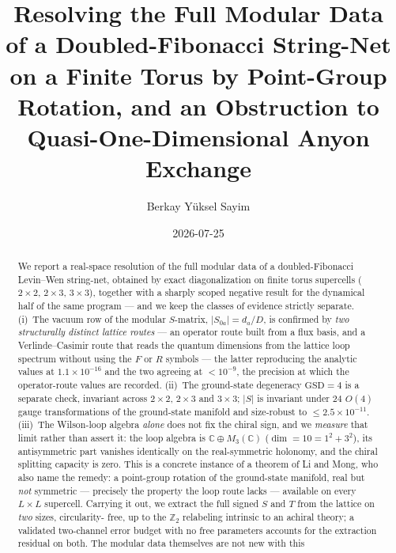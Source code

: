 \documentclass[aps,pra,twocolumn,superscriptaddress,longbibliography,floatfix,nofootinbib]{revtex4-2}
\begin{document}
\setcounter{secnumdepth}{3}

\title{Resolving the Full Modular Data of a Doubled-Fibonacci String-Net
       on a Finite Torus by Point-Group Rotation, and an Obstruction to
       Quasi-One-Dimensional Anyon Exchange}

\author{Berkay Y\"uksel Sayim}

\date{2026-07-25}

\begin{abstract}
We report a real-space resolution of the full modular data of a doubled-Fibonacci Levin--Wen
string-net, obtained by exact diagonalization on finite torus supercells ($2\times2$,
$2\times3$, $3\times3$), together with a sharply scoped negative result for the dynamical half
of the same program --- and we keep the classes of evidence strictly separate. (i)~The vacuum row of the modular
$S$-matrix, $|S_{0a}| = d_a/D$, is confirmed by \emph{two structurally distinct
lattice routes} --- an operator route built from a flux basis, and a
Verlinde--Casimir route that reads the quantum dimensions from the lattice loop
spectrum without using the $F$ or $R$ symbols --- the latter reproducing the
analytic values at $1.1\times10^{-16}$ and the two agreeing at $<10^{-9}$, the
precision at which the operator-route values are recorded. (ii)~The ground-state
degeneracy $\mathrm{GSD}=4$ is a separate check, invariant across $2\times2$,
$2\times3$ and $3\times3$; $|S|$ is invariant under $24$ $O(4)$ gauge
transformations of the ground-state manifold and size-robust to
$\le2.5\times10^{-11}$. (iii)~The Wilson-loop algebra \emph{alone} does not fix
the chiral sign, and we \emph{measure} that limit rather than assert it: the
loop algebra is $\mathbb{C}\oplus M_3(\mathbb{C})$ ($\dim=10=1^{2}+3^{2}$), its
antisymmetric part vanishes identically on the real-symmetric holonomy, and the
chiral splitting capacity is zero. This is a concrete instance of a theorem of
Li and Mong, who also name the remedy: a point-group rotation of the
ground-state manifold, real but \emph{not} symmetric --- precisely the property the loop route
lacks --- available on every $L\times L$ supercell. Carrying it out, we extract
the full signed $S$ and $T$ from the lattice on \emph{two} sizes, circularity-
free, up to the $\mathbb{Z}_2$ relabeling intrinsic to an achiral theory; a
validated two-channel error budget with no free parameters accounts for the
extraction residual on both. The modular data themselves are not new with this

\end{abstract}
\end{document}
